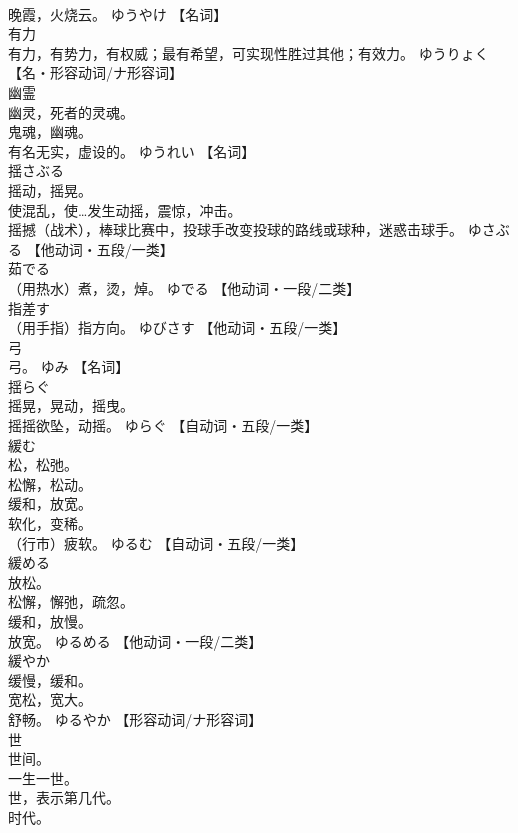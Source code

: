 \documentclass[8pt]{extreport}
\begin{document}
\begin{CJK}{UTF8}{min}
\\	晚霞，火烧云。	ゆうやけ		【名词】
\\	有力	
\\	有力，有势力，有权威；最有希望，可实现性胜过其他；有效力。	ゆうりょく		【名・形容动词/ナ形容词】
\\	幽霊	
\\	幽灵，死者的灵魂。 
\\	鬼魂，幽魂。 
\\	有名无实，虚设的。	ゆうれい		【名词】
\\	揺さぶる	
\\	摇动，摇晃。 
\\	使混乱，使…发生动摇，震惊，冲击。 
\\	摇撼（战术），棒球比赛中，投球手改变投球的路线或球种，迷惑击球手。	ゆさぶる		【他动词・五段/一类】
\\	茹でる	
\\	（用热水）煮，烫，焯。	ゆでる		【他动词・一段/二类】
\\	指差す	
\\	（用手指）指方向。	ゆびさす		【他动词・五段/一类】
\\	弓	
\\	弓。	ゆみ		【名词】
\\	揺らぐ	
\\	摇晃，晃动，摇曳。 
\\	摇摇欲坠，动摇。	ゆらぐ		【自动词・五段/一类】
\\	緩む	
\\	松，松弛。 
\\	松懈，松动。 
\\	缓和，放宽。 
\\	软化，变稀。 
\\	（行市）疲软。	ゆるむ		【自动词・五段/一类】
\\	緩める	
\\	放松。 
\\	松懈，懈弛，疏忽。 
\\	缓和，放慢。 
\\	放宽。	ゆるめる		【他动词・一段/二类】
\\	緩やか	
\\	缓慢，缓和。 
\\	宽松，宽大。 
\\	舒畅。	ゆるやか		【形容动词/ナ形容词】
\\	世	
\\	世间。 
\\	一生一世。 
\\	世，表示第几代。 
\\	时代。 

\end{CJK}
\end{document}
